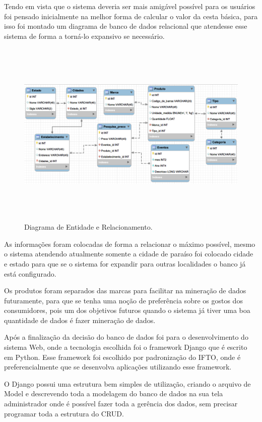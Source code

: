 \documentclass{ifto-tex}
\begin{document}
	Tendo em vista que o sistema deveria ser mais amigável  possível para os usuários foi pensado inicialmente na melhor forma de calcular o valor da cesta básica, para isso foi montado um diagrama de banco de dados relacional que atendesse esse sistema de forma a torná-lo expansivo se necessário.
	\begin{figure}[H]
		\begin{center}
			\includegraphics[width=16.0cm, height= 9.0cm]{cestadiagrama.png}    %
			\caption{Diagrama de Entidade e Relacionamento.} 
			\label{fig:faces}
		\end{center}
	\end{figure}
As informações foram colocadas de forma a relacionar o máximo possível, mesmo o sistema atendendo atualmente somente a cidade de paraíso foi colocado cidade e estado para que se o sistema for expandir para outras localidades o banco já está configurado.

Os produtos foram separados das marcas para facilitar na mineração de dados futuramente, para que se tenha uma noção de preferência sobre os gostos dos consumidores, pois um dos objetivos futuros quando o sistema já tiver uma boa quantidade de dados é fazer mineração de dados.

Após a finalização da decisão do banco de dados foi para o desenvolvimento do sistema Web, onde a tecnologia escolhida foi o framework Django que é escrito em Python. Esse framework foi escolhido por padronização do IFTO, onde é preferencialmente que se desenvolva aplicações utilizando esse framework.

O Django possui uma estrutura bem simples de utilização, criando o arquivo de Model e descrevendo toda a modelagem do banco de dados na sua tela administrador onde é possível fazer toda a gerência dos dados, sem precisar programar toda a estrutura do CRUD.
\end{document}
